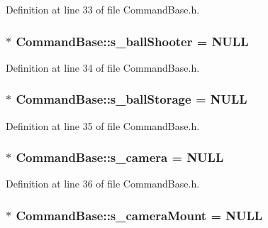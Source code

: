 \-Definition at line 33 of file \-Command\-Base.\-h.

\hypertarget{class_command_base_ac48c9220b0d3a09b0b058875eff8c650}{
\subsubsection[{s\-\_\-ball\-Shooter}]{ $\ast$ {\bf \-Command\-Base\-::s\-\_\-ball\-Shooter} = \-N\-U\-L\-L}}\label{class_command_base_ac48c9220b0d3a09b0b058875eff8c650}


\-Definition at line 34 of file \-Command\-Base.\-h.

\hypertarget{class_command_base_a6e7f4b4c66e09b1d1d2e9496d0b018da}{
\subsubsection[{s\-\_\-ball\-Storage}]{ $\ast$ {\bf \-Command\-Base\-::s\-\_\-ball\-Storage} = \-N\-U\-L\-L}}\label{class_command_base_a6e7f4b4c66e09b1d1d2e9496d0b018da}


\-Definition at line 35 of file \-Command\-Base.\-h.

\hypertarget{class_command_base_a9586e8acac30698641eddb49066e1d47}{
\subsubsection[{s\-\_\-camera}]{ $\ast$ {\bf \-Command\-Base\-::s\-\_\-camera} = \-N\-U\-L\-L}}\label{class_command_base_a9586e8acac30698641eddb49066e1d47}


\-Definition at line 36 of file \-Command\-Base.\-h.

\hypertarget{class_command_base_a73790b416a401faa311259bd45f7aa47}{
\subsubsection[{s\-\_\-camera\-Mount}]{ $\ast$ {\bf \-Command\-Base\-::s\-\_\-camera\-Mount} = \-N\-U\-L\-L}}\label{class_command_base_a73790b416a401faa311259bd45f7aa47}


